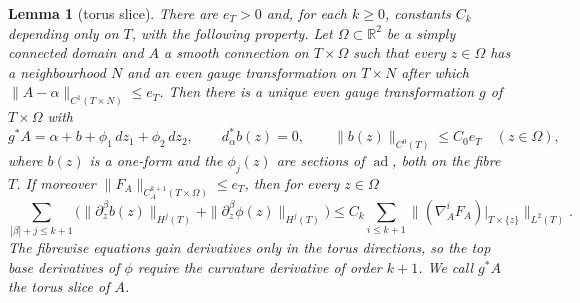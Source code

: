 \documentclass[11pt]{amsart}
\newtheorem{lemma}[theorem]{Lemma}
\theoremstyle{definition}
\theoremstyle{remark}
\theoremstyle{plain}
\numberwithin{equation}{section}
\newcommand{\RR}{\mathbb{R}}
\newcommand{\ad}{\operatorname{ad}}
\begin{document}
\begin{lemma}[torus slice]\label{lem:torus-slice}
There are $e_T>0$ and, for each $k\ge0$, constants $C_k$ depending only on $T$,
with the following property. Let $\Omega\subset\RR^2$ be a simply connected
domain and $A$ a smooth connection on $T\times\Omega$ such that every $z\in\Omega$
has a neighbourhood $N$ and an even gauge transformation on $T\times N$ after
which $\|A-\alpha\|_{C^1(T\times N)}\le e_T$. Then there is a unique even gauge
transformation $g$ of $T\times\Omega$ with
\[
g^*A=\alpha+b+\phi_1\,dz_1+\phi_2\,dz_2,\qquad d_\alpha^*b(z)=0,\qquad
\|b(z)\|_{C^0(T)}\le C_0e_T\quad(z\in\Omega),
\]
where $b(z)$ is a one-form and the $\phi_j(z)$ are sections of $\ad$, both on the
fibre $T$. If moreover $\|F_A\|_{C^{k+1}_A(T\times\Omega)}\le e_T$, then for every
$z\in\Omega$
\begin{equation}\label{eq:torus-slice}
\sum_{|\beta|+j\le k+1}\bigl(\|\partial_z^\beta b(z)\|_{H^j(T)}
+\|\partial_z^\beta\phi(z)\|_{H^j(T)}\bigr)
\le C_k\sum_{i\le k+1}\|(\nabla_A^iF_A)|_{T\times\{z\}}\|_{L^2(T)} .
\end{equation}
The fibrewise equations gain derivatives only in the torus directions, so the
top base derivatives of $\phi$ require the curvature derivative of order $k+1$.
We call $g^*A$ the \emph{torus slice} of $A$.
\end{lemma}
\end{document}
